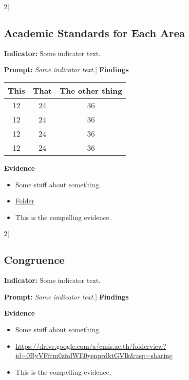 \documentclass{report}
\begin{document}
\begin{paracol}{2}[\subsection{Academic Standards for Each Area}
\noindent\textbf{Indicator:} Some indicator text.

\noindent\textbf{Prompt:} \textit{Some indicator text.}]
\noindent\textbf{Findings}

\blindtext


\begin{table}[!h]
\begin{tabular}{c | c || c}
This & That & The other thing \\
\hline
12   &  24  &  36 \\
12   &  24  &  36 \\
12   &  24  &  36 \\
12   &  24  &  36 \\
\end{tabular}
\end{table}

\switchcolumn
\noindent\textbf{Evidence}
\vspace{-\topsep}

\begin{itemize}[leftmargin=*]
\setlength{\parskip}{0pt}
\setlength{\itemsep}{0pt plus 1pt}
\item Some stuff about something.
\item \href{https://drive.google.com/a/cmis.ac.th/folderview?id=0ByVFfrm0zfolWE0yenprdktGVlk&usp=sharing}{Folder}
\item This is the compelling evidence.
\end{itemize}

\end{paracol}
\begin{paracol}{2}[\subsection{Congruence}
\noindent\textbf{Indicator:} Some indicator text.

\noindent\textbf{Prompt:} \textit{Some indicator text.}]
\noindent\textbf{Findings}

\blindtext

\blinditemize[6]

\blindtext

\switchcolumn
\noindent\textbf{Evidence}
\vspace{-\topsep}

\begin{itemize}[leftmargin=*]
\setlength{\parskip}{0pt}
\setlength{\itemsep}{0pt plus 1pt}
\item Some stuff about something.
\item \url{https://drive.google.com/a/cmis.ac.th/folderview?id=0ByVFfrm0zfolWE0yenprdktGVlk&usp=sharing}
\item This is the compelling evidence.
\end{itemize}

\end{paracol}
\end{document}
